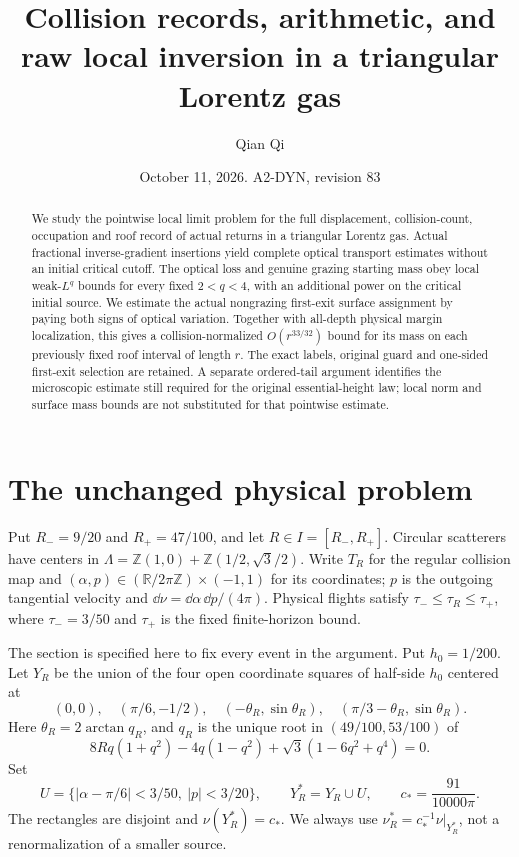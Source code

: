 \documentclass[11pt,reqno]{amsart}
\title[Collision records and raw local inversion]{Collision records, arithmetic, and raw local inversion in a triangular Lorentz gas}
\author{Qian Qi}
\date{October 11, 2026. A2-DYN, revision 83}
\numberwithin{equation}{section}
\theoremstyle{definition}
\theoremstyle{remark}\newtheorem{remark}[theorem]{Remark}
\newcommand{\R}{\mathbb R}\newcommand{\Z}{\mathbb Z}
\begin{document}
\raggedbottom
\begin{abstract}
We study the pointwise local limit problem for the full displacement,
collision-count, occupation and roof record of actual returns in a
triangular Lorentz gas. Actual fractional inverse-gradient insertions
yield complete optical transport estimates without an initial critical
cutoff. The optical loss and genuine grazing starting mass obey local
weak-$L^q$ bounds for every fixed $2<q<4$, with an additional power
on the critical initial source. We estimate the actual nongrazing
first-exit surface assignment by paying both signs of optical variation.
Together with all-depth physical margin localization, this gives a
collision-normalized $O(r^{33/32})$ bound for its mass on each previously
fixed roof interval of length $r$. The exact labels, original guard and
one-sided first-exit selection are retained. A separate ordered-tail
argument identifies the microscopic estimate still required for the
original essential-height law; local norm and surface mass bounds are
not substituted for that pointwise estimate.
\end{abstract}
\maketitle

\section{The unchanged physical problem}
Put $R_-=9/20$ and $R_+=47/100$, and let $R\in I=[R_-,R_+]$. Circular scatterers have centers in
$\Lambda=\Z(1,0)+\Z(1/2,\sqrt3/2)$. Write $T_R$ for the regular
collision map and $(\alpha,p)\in(\R/2\pi\Z)\times(-1,1)$ for its
coordinates; $p$ is the outgoing tangential velocity and
$\dd\nu=\dd\alpha\,\dd p/(4\pi)$. Physical flights satisfy
$\tau_-\le\tau_R\le\tau_+$, where $\tau_-=3/50$ and $\tau_+$
is the fixed finite-horizon bound.

The section is specified here to fix every event in the argument.
Put $h_0=1/200$. Let $Y_R$ be the union of the four open coordinate
squares of half-side $h_0$ centered at
\[
 (0,0),\quad(\pi/6,-1/2),\quad
 (-\theta_R,\sin\theta_R),\quad
 (\pi/3-\theta_R,\sin\theta_R).
\]
Here $\theta_R=2\arctan q_R$, and $q_R$ is the unique root in
$(49/100,53/100)$ of
\[
 8Rq(1+q^2)-4q(1-q^2)+\sqrt3(1-6q^2+q^4)=0.
\]
Set
\[
 U=\{|\alpha-\pi/6|<3/50,\ |p|<3/20\},\qquad
 Y_R^*=Y_R\cup U,\qquad c_*=\frac{91}{10000\pi}.
\]
The rectangles are disjoint and $\nu(Y_R^*)=c_*$. We always use
$\nu_R^*=c_*^{-1}\nu|_{Y_R^*}$, not a renormalization of a smaller
source.
\end{document}
